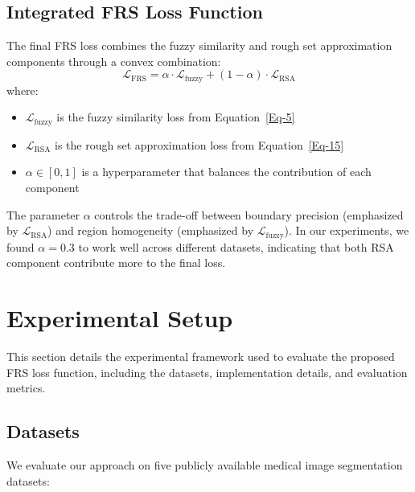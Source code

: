 \documentclass[review]{elsarticle}
\begin{document}
\subsection{Integrated FRS Loss Function}
The final FRS loss combines the fuzzy similarity and rough set approximation components through a convex combination:
\begin{equation}\label{Eq-16}
    \mathcal{L}_{\text{FRS}} = \alpha \cdot \mathcal{L}_{\text{fuzzy}} + (1 - \alpha) \cdot \mathcal{L}_{\text{RSA}}
\end{equation}
where:
\begin{itemize}
	\item $\mathcal{L}_{\text{fuzzy}}$ is the fuzzy similarity loss from Equation~\eqref{Eq-5}
    \item $\mathcal{L}_{\text{RSA}}$ is the rough set approximation loss from Equation~\eqref{Eq-15}
    \item $\alpha \in [0,1]$ is a hyperparameter that balances the contribution of each component
\end{itemize}
The parameter $\alpha$ controls the trade-off between boundary precision (emphasized by $\mathcal{L}_{\text{RSA}}$) and region homogeneity (emphasized by $\mathcal{L}_{\text{fuzzy}}$). In our experiments, we found $\alpha = 0.3$ to work well across different datasets, indicating that both RSA component contribute more to the final loss.


\section{Experimental Setup}\label{setup}
This section details the experimental framework used to evaluate the proposed FRS loss function, including the datasets, implementation details, and evaluation metrics.

\subsection{Datasets}
We evaluate our approach on five publicly available medical image segmentation datasets:
\end{document}
